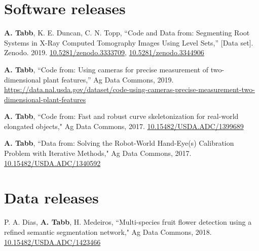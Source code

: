 \documentclass[letterpaper,11pt]{article}
\begin{document}
\section{Software releases}
\begin{enumerate}[noitemsep, leftmargin=*,label={[S\arabic*]}]
\item{\textbf{A. Tabb}, K. E. Duncan, C. N. Topp, “Code and Data from: Segmenting Root Systems in X-Ray Computed Tomography Images Using Level Sets,” [Data set]. Zenodo. 2019. \href{http://doi.org/10.5281/zenodo.3333709}{10.5281/zenodo.3333709},  \href{http://doi.org/10.5281/zenodo.3344906}{10.5281/zenodo.3344906}}

\item{\textbf{A. Tabb}, “Code from: Using cameras for precise measurement of two-dimensional plant features,” Ag Data Commons, 2019. \href{https://data.nal.usda.gov/dataset/code-using-cameras-precise-measurement-two-dimensional-plant-features}{https://data.nal.usda.gov/dataset/code-using-cameras-precise-measurement-two-dimensional-plant-features}} 

\item{\textbf{A. Tabb}, ``Code from: Fast and robust curve skeletonization for real-world elongated objects," Ag Data Commons, 2017.  \href{http://dx.doi.org/10.15482/USDA.ADC/1399689}{10.15482/USDA.ADC/1399689}}

\item{\textbf{A. Tabb},  ``Data from: Solving the Robot-World Hand-Eye(s) Calibration Problem with Iterative Methods," Ag Data Commons, 2017. \href{http://dx.doi.org/10.15482/USDA.ADC/1340592}{10.15482/USDA.ADC/1340592}}
\end{enumerate}

\section{Data releases}
\begin{enumerate}[noitemsep, leftmargin=*,label={[D\arabic*]}]
\item{P. A. Dias, \textbf{A. Tabb}, H. Medeiros,  ``Multi-species fruit flower detection using a refined semantic segmentation network," Ag Data Commons, 2018. \href{http://dx.doi.org/10.15482/USDA.ADC/1423466}{10.15482/USDA.ADC/1423466}}
\end{enumerate}

\end{document}
